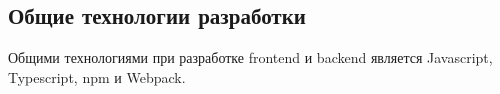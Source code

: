 \subsection{Общие технологии разработки}

Общими технологиями при разработке frontend и backend является Javascript, Typescript, npm и Webpack.








